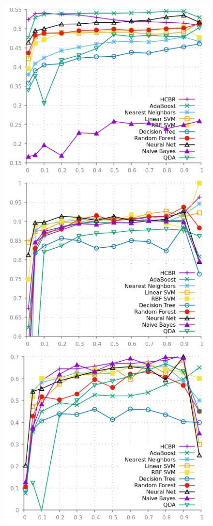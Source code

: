 \documentclass[preprint,12pt]{elsarticle}
\theoremstyle{definition}
\begin{document}
\begin{figure}[!h]\centering
\includegraphics[scale=0.2]{img/mcc_by_examples_adult.png}
\hfill
\includegraphics[scale=0.2]{img/mcc_by_examples_breast.png}
\hfill
\includegraphics[scale=0.2]{img/mcc_by_examples_heart.png}

\end{figure}
\end{document}

